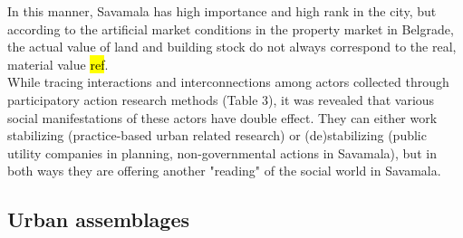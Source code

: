 \documentclass[11pt]{report}
\begin{document}
In this manner, Savamala has high importance and high rank in the city, but according to the artificial market conditions in the property market in Belgrade, the actual value of land and building stock do not always correspond to the real, material value \hl{ref}.
\\
While tracing interactions and interconnections among actors collected through participatory action research methods (Table 3), it was revealed that various social manifestations of these actors have double effect. They can either work stabilizing (practice-based urban related research) or (de)stabilizing (public utility companies in planning, non-governmental actions in Savamala), but in both ways they are offering another "reading" of the social world in Savamala.

\subsection{Urban assemblages}
\end{document}
